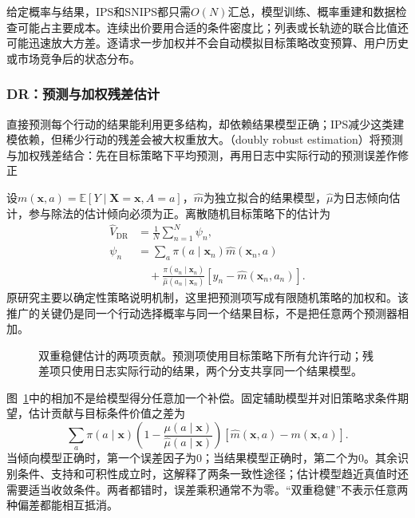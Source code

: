 给定概率与结果，IPS和SNIPS都只需$O(N)$汇总，模型训练、概率重建和数据检查可能占主要成本。连续出价要用合适的条件密度比；列表或长轨迹的联合比值还可能迅速放大方差。逐请求一步加权并不会自动模拟目标策略改变预算、用户历史或市场竞争后的状态分布。

\Needspace{90mm}
\subsubsection{DR：预测与加权残差估计}
\label{sec:rs-evaluation-dr}

直接预测每个行动的结果能利用更多结构，却依赖结果模型正确；IPS减少这类建模依赖，但稀少行动的残差会被大权重放大。（doubly robust estimation）将预测与加权残差结合：先在目标策略下平均预测，再用日志中实际行动的预测误差作修正

设$m(\bm x,a)=\mathbb E[Y\mid\bm X=\bm x,A=a]$，$\widehat m$为独立拟合的结果模型，$\widehat\mu$为日志倾向估计，参与除法的估计倾向必须为正。离散随机目标策略下的估计为
\begin{equation}
  \begin{aligned}
    \widehat V_{\mathrm{DR}}
      &=\frac1N\sum_{n=1}^{N}\psi_n,\\
    \psi_n
      &=\sum_a\pi(a\mid\bm x_n)\widehat m(\bm x_n,a)\\
      &\quad+
       \frac{\pi(a_n\mid\bm x_n)}{\widehat\mu(a_n\mid\bm x_n)}
       \left[y_n-\widehat m(\bm x_n,a_n)\right].
  \end{aligned}
  \label{eq:rs-evaluation-dr}
\end{equation}
原研究主要以确定性策略说明机制，这里把预测项写成有限随机策略的加权和。该推广的关键仍是同一个行动选择概率与同一个结果目标，不是把任意两个预测器相加。

\begin{figure}[htbp]
  \centering
  
  \caption{双重稳健估计的两项贡献。预测项使用目标策略下所有允许行动；残差项只使用日志实际行动的结果，两个分支共享同一个结果模型。}
  \label{fig:rs-evaluation-dr}
\end{figure}

图~\ref{fig:rs-evaluation-dr}中的相加不是给模型得分任意加一个补偿。固定辅助模型并对旧策略求条件期望，估计贡献与目标条件价值之差为
\begin{equation}
  \sum_a\pi(a\mid\bm x)
    \left(1-\frac{\mu(a\mid\bm x)}
                     {\widehat\mu(a\mid\bm x)}\right)
    \left[\widehat m(\bm x,a)-m(\bm x,a)\right].
  \label{eq:rs-evaluation-dr-bias}
\end{equation}
当倾向模型正确时，第一个误差因子为0；当结果模型正确时，第二个为0。其余识别条件、支持和可积性成立时，这解释了两条一致性途径；估计模型趋近真值时还需要适当收敛条件。两者都错时，误差乘积通常不为零。“双重稳健”不表示任意两种偏差都能相互抵消。

